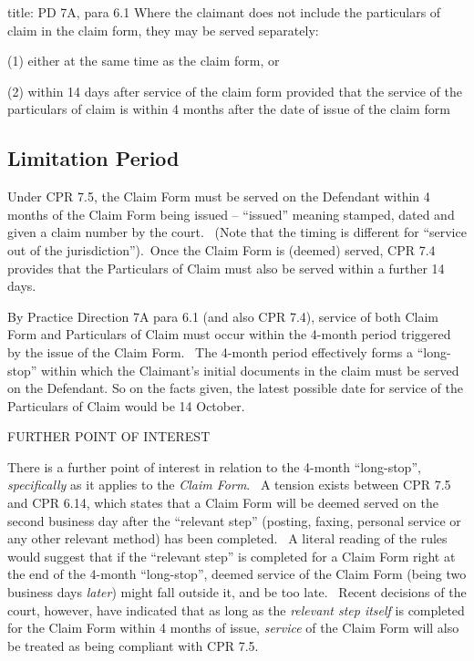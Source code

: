 \documentclass[
]{article}
\newenvironment{Shaded}{}{}
\newcommand{\NormalTok}[1]{#1}
\begin{document}
\begin{Shaded}
\begin{Highlighting}[]
\NormalTok{title: PD 7A, para 6.1}
\NormalTok{Where the claimant does not include the particulars of claim in the claim form, they may be served separately:}

\NormalTok{(1) either at the same time as the claim form, or}

\NormalTok{(2) within 14 days after service of the claim form provided that the service of the particulars of claim is within 4 months after the date of issue of the claim form}
\end{Highlighting}
\end{Shaded}

\hypertarget{limitation-period}{%
\subsection{Limitation Period}\label{limitation-period}}

Under CPR 7.5, the Claim Form must be served on the Defendant within 4
months of the Claim Form being issued -- ``issued'' meaning stamped,
dated and given a claim number by the court.~ (Note that the timing is
different for ``service out of the jurisdiction'').~Once the Claim Form
is (deemed) served, CPR 7.4 provides that the Particulars of Claim must
also be served within a further 14 days.~

By Practice Direction 7A para 6.1 (and also CPR 7.4), service of both
Claim Form and Particulars of Claim must occur within the 4-month period
triggered by the issue of the Claim Form.~ The 4-month period
effectively forms a ``long-stop'' within which the Claimant's initial
documents in the claim must be served on the Defendant. So on the facts
given, the latest possible date for service of the Particulars of Claim
would be 14 October.~

FURTHER POINT OF INTEREST

There is a further point of interest in relation to the 4-month
``long-stop'', \emph{specifically} as it applies to the \emph{Claim
Form}.~ A tension exists between CPR 7.5 and CPR 6.14, which states that
a Claim Form will be deemed served on the second business day after the
``relevant step'' (posting, faxing, personal service or any other
relevant method) has been completed.~ A literal reading of the rules
would suggest that if the ``relevant step'' is completed for a Claim
Form right at the end of the 4-month ``long-stop'', deemed service of
the Claim Form (being two business days \emph{later}) might fall outside
it, and be too late.~ Recent decisions of the court, however, have
indicated that as long as the \emph{relevant step itself} is completed
for the Claim Form within 4 months of issue, \emph{service} of the Claim
Form will also be treated as being compliant with CPR 7.5.
\end{document}
